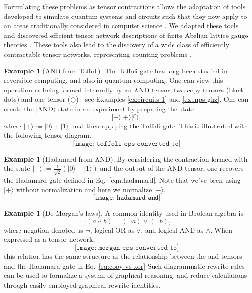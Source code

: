 \documentclass[aps,pra,12pt,nofootinbib,superscriptaddress,longbibliography]{revtex4-1}
\newcommand{\jb}[1]{\todo[inline]{{\textbf{[}JB: #1\textbf{]}}}}
\theoremstyle{plain}
\theoremstyle{definition}
\newtheorem{example}[theorem]{Example}
\newcommand{\ket}[1]{\mbox{$|#1\rangle$}}
\newcommand{\XOR}{{\sf{XOR}}}
\newcommand{\COPY}{{\sf{COPY}}}
\newcommand{\be}{\begin{equation}}
\newcommand{\ee}{\end{equation}}
\begin{document}
Formulating these problems as tensor contractions allows the adaptation of tools developed to simulate quantum systems and circuits such that they now apply to an areas
traditionally considered in computer science \cite{VTN,BMT15}. We adapted these tools and discovered efficient tensor network descriptions of finite Abelian lattice gauge theories \cite{2012JPhA...45a5309D}.  These tools also lead to the discovery of a wide class of efficiently contractable tensor networks, representing counting problems \cite{BMT15}.
  

\begin{example}[AND from Toffoli]
The Toffoli gate has long been studied in reversible computing, and also in quantum computing.
One can view this operation as being formed internally by an AND tensor, two copy tensors (black dots)
 and one \XOR{} tensor ($\oplus$)---see Examples \ref{ex:circuits-1} and \ref{ex:mps-ghz}.  One can create the $\ket{\text{AND}}$ state in an experiment by preparing the state
\begin{equation}
 \ket{+}\ket{+}\ket{0},
\end{equation}
where $\ket{+}:= \ket{0}+\ket{1}$,
and then applying the Toffoli gate.  This is illustrated with the following tensor diagram.  
\be
 \texttt{[image: toffoli-eps-converted-to]}  
\ee
\end{example}

\begin{example}[Hadamard from AND]
By considering the contraction formed with the state
$\ket{-}:= \frac{1}{\sqrt{2}}(\ket{0}-\ket{1})$ and the output of the AND tensor, one recovers the Hadamard gate defined in Eq.~\eqref{eqn:hadamard}.
Note that we've been using $\ket{+}$ without normalization and here we normalize $\ket{-}$. 
\be
 \texttt{[image: hadamard-and]}
\ee

\end{example}

\begin{example}[De Morgan's laws]
A common identity used in Boolean algebra is 
\be
\neg (a \wedge b) = (\neg a)\vee(\neg b),
\ee 
where negation denoted as $\neg$, logical OR as $\vee$, and logical AND as $\wedge$.
When expressed as a tensor network,
\be
 \texttt{[image: morgan-eps-converted-to]}
\ee
this relation has the same structure as the relationship between the \COPY{} and \XOR{} tensors and the Hadamard gate in Eq.~\eqref{eq:copy-vs-xor}
Such diagrammatic rewrite rules can be used to formalize a system of graphical reasoning, and reduce calculations through easily employed graphical rewrite identities.
\end{example}
\end{document}
